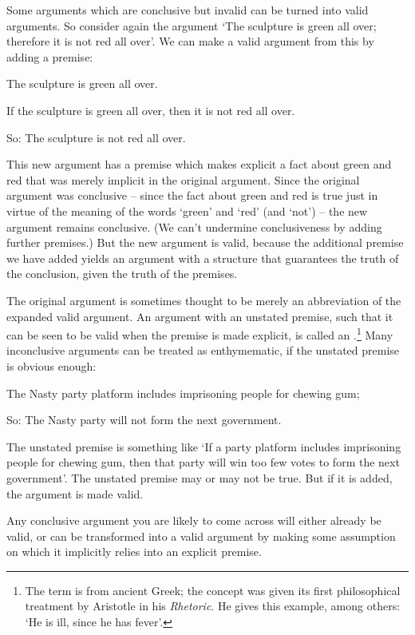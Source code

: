 Some arguments which are conclusive but invalid can be turned into valid arguments. So consider again the argument `The sculpture is green all over; therefore it is not red all over'. We can make a valid argument from this by adding a premise: 
	\begin{earg}
		\item[] The sculpture is green all over.
		\item[] \textsf{If} the sculpture is green all over, \textsf{then} it is not red all over.
		\item[So:] The sculpture is not red all over. 
	\end{earg} This new argument has a premise which makes explicit a fact about green and red that was merely implicit in the original argument. Since the original argument was conclusive – since the fact about green and red is true just in virtue of the meaning of the words `green' and `red' (and `not') – the new argument remains conclusive. (We can't undermine conclusiveness by adding further premises.) But the new argument is valid, because the additional premise we have added yields an argument with a structure that guarantees the truth of the conclusion, given the truth of the premises.

	The original argument is sometimes thought to be merely an abbreviation of the expanded valid argument. An argument with an unstated premise, such that it can be seen to be valid when the premise is made explicit, is called an .\footnote{The term is from ancient Greek; the concept was given its first philosophical treatment by Aristotle in his \emph{Rhetoric}. He gives this example, among others: `He is ill, since he has fever'.} Many inconclusive arguments can be treated as enthymematic, if the unstated premise is obvious enough:
		\begin{earg}
		\item[] The Nasty party platform includes imprisoning people for chewing gum; 
		\item[So:] The Nasty party will not form the next government. 
	\end{earg} The unstated premise is something like `If a party platform includes imprisoning people for chewing gum, then that party will win too few votes to form the next government'. The unstated premise may or may not be true. But if it is added, the argument is made valid. 

	Any conclusive argument you are likely to come across will either already be valid, or can be transformed into a valid argument by making some assumption on which it implicitly relies into an explicit premise.

